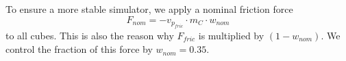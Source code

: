 To ensure a more stable simulator, we apply a nominal friction force
\begin{equation}
F_\textit{nom} = -v_{p_\textit{fric}} \cdot m_C \cdot w_\textit{nom}
\end{equation}
to all cubes.
This is also the reason why $F_\textit{fric}$ is multiplied by $(1 - w_\textit{nom})$.
We control the fraction of this force by $w_\textit{nom} = 0.35$.


